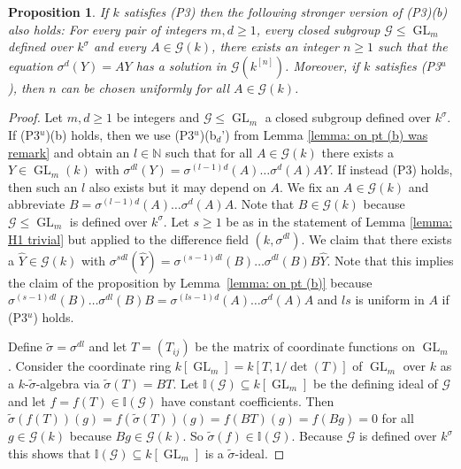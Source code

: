 \documentclass[oneside,reqno]{amsart}
\newtheorem{prop}[theo]{Proposition}
\theoremstyle{definition}
\newcommand{\G}{\mathcal{G}}
\newcommand{\Gl}{\operatorname{GL}}
\newcommand{\s}{\sigma}
\newcommand{\kn}{k^{[n]}}
\newcommand{\pt}{{\rm{(P3$^u$)}}}
\newcommand{\ptweak}{{\rm{(P3)}}}
\begin{document}
\begin{prop} \label{prop: stronger P3b}
  If $k$ satisfies \ptweak{} then the following stronger version of \ptweak{}(b) also holds:
    For every pair of integers $m,d \geq 1$, every closed subgroup $\G\leq\Gl_m$ defined over $k^\s$ and every $A\in\G(k)$, there exists an integer $n\geq 1$ such that the equation $\s^d(Y)=AY$ has a solution in $\G(\kn)$. Moreover, if $k$ satisfies \pt{}, then $n$ can be chosen uniformly for all $A \in \G(k)$.  
\end{prop}
\begin{proof}
Let $m,d \geq 1$ be integers and $\G\leq \Gl_m$ a closed subgroup defined over $k^\s$. If \pt{}(b) holds, then we use \pt{}(b$_d$') from Lemma \ref{lemma: on pt (b) was remark} and obtain an $l\in \mathbb{N}$ such that for all $A\in \G(k)$ there exists a $Y\in \Gl_m(k)$ with $\s^{dl}(Y)=\s^{(l-1)d}(A)\ldots\s^d(A)AY$. If instead \ptweak{} holds, then such an $l$ also exists but it may depend on $A$. %
 We fix an $A\in \G(k)$ and abbreviate $B=\s^{(l-1)d}(A)\ldots\s^d(A)A$. Note that $B \in \G(k)$ because $\G\leq\Gl_m$ is defined over $k^\s$. 
 Let $s\geq 1$ be as in the statement of Lemma \ref{lemma: H1 trivial} but applied to the difference field $(k,\s^{dl})$.
 We claim that there exists a $\hat Y\in \G(k)$ with $\s^{sdl}(\hat Y)=\s^{(s-1)dl}(B)\ldots\s^{dl}(B)B\hat Y$. Note that this implies the claim of the proposition by Lemma~\ref{lemma: on pt (b)} because $\s^{(s-1)dl}(B)\ldots\s^{dl}(B)B=\s^{(ls-1)d}(A)\ldots\s^d(A)A$ and $ls$ is uniform in $A$ if \pt{} holds.
 
%  
%  


Define ${\tilde \s}=\s^{dl}$ and let $T=(T_{ij})$ be the matrix of coordinate functions on $\Gl_m$. 
Consider the coordinate ring $k[\Gl_m]=k[T,1/\det(T)]$ of $\Gl_m$ over $k$ as a $k$-${\tilde \s}$-algebra via ${\tilde \s}(T)=BT$. 
Let $\mathbb{I}(\G)\subseteq k[\Gl_m]$ be the defining ideal of $\G$ and let $f=f(T)\in \mathbb{I}(\G)$ have constant coefficients. Then $\tilde \s(f(T))(g)=f(\tilde\s(T))(g)=f(BT)(g)=f(Bg)=0$ for all $g\in \G(k)$ because $Bg\in\G(k)$. So $\tilde \s(f)\in \mathbb{I}(\G)$. Because $\G$ is defined over $k^\s$ this shows that $\mathbb{I}(\G)\subseteq k[\Gl_m]$ is a ${\tilde \s}$-ideal.



%



\end{proof}
\end{document}
